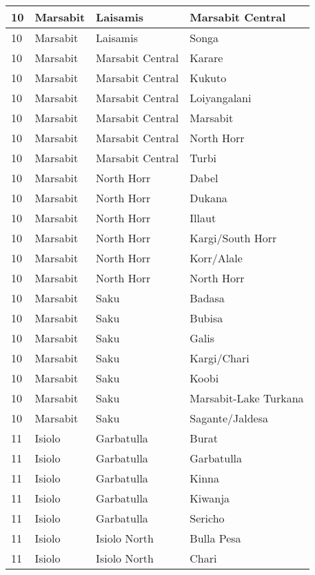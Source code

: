 \begin{table}[!ht]
\begin{tabular}{|l|l|l|l|}
        10 & Marsabit & Laisamis & Marsabit Central \\ \hline
        10 & Marsabit & Laisamis & Songa \\ \hline
        10 & Marsabit & Marsabit Central & Karare \\ \hline
        10 & Marsabit & Marsabit Central & Kukuto \\ \hline
        10 & Marsabit & Marsabit Central & Loiyangalani \\ \hline
        10 & Marsabit & Marsabit Central & Marsabit \\ \hline
        10 & Marsabit & Marsabit Central & North Horr \\ \hline
        10 & Marsabit & Marsabit Central & Turbi \\ \hline
        10 & Marsabit & North Horr & Dabel \\ \hline
        10 & Marsabit & North Horr & Dukana \\ \hline
        10 & Marsabit & North Horr & Illaut \\ \hline
        10 & Marsabit & North Horr & Kargi/South Horr \\ \hline
        10 & Marsabit & North Horr & Korr/Alale \\ \hline
        10 & Marsabit & North Horr & North Horr \\ \hline
        10 & Marsabit & Saku & Badasa \\ \hline
        10 & Marsabit & Saku & Bubisa \\ \hline
        10 & Marsabit & Saku & Galis \\ \hline
        10 & Marsabit & Saku & Kargi/Chari \\ \hline
        10 & Marsabit & Saku & Koobi \\ \hline
        10 & Marsabit & Saku & Marsabit-Lake Turkana \\ \hline
        10 & Marsabit & Saku & Sagante/Jaldesa \\ \hline
        11 & Isiolo & Garbatulla & Burat \\ \hline
        11 & Isiolo & Garbatulla & Garbatulla \\ \hline
        11 & Isiolo & Garbatulla & Kinna \\ \hline
        11 & Isiolo & Garbatulla & Kiwanja \\ \hline
        11 & Isiolo & Garbatulla & Sericho \\ \hline
        11 & Isiolo & Isiolo North & Bulla Pesa \\ \hline
        11 & Isiolo & Isiolo North & Chari \\ \hline

\end{tabular}
\end{table}
